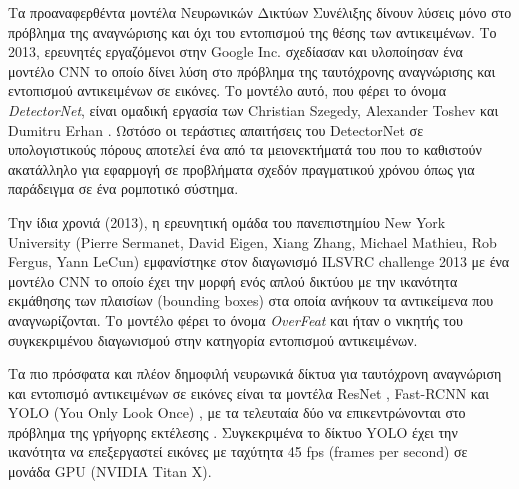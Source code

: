 Τα προαναφερθέντα μοντέλα Νευρωνικών Δικτύων Συνέλιξης δίνουν
λύσεις μόνο στο πρόβλημα της αναγνώρισης και όχι
του εντοπισμού της θέσης των αντικειμένων.
Το 2013, ερευνητές εργαζόμενοι στην Google Inc. σχεδίασαν και υλοποίησαν ένα
μοντέλο CNN το οποίο δίνει λύση στο πρόβλημα της ταυτόχρονης
αναγνώρισης και εντοπισμού αντικειμένων σε εικόνες.
Το μοντέλο αυτό, που φέρει το όνομα \emph{DetectorNet}, είναι ομαδική εργασία των
Christian Szegedy, Alexander Toshev και Dumitru Erhan \cite{szegedy2013deep}.
Ωστόσο οι τεράστιες απαιτήσεις του DetectorNet σε υπολογιστικούς πόρους αποτελεί
ένα από τα μειονεκτήματά του που το καθιστούν ακατάλληλο για εφαρμογή σε
προβλήματα σχεδόν πραγματικού χρόνου όπως για παράδειγμα σε ένα
ρομποτικό σύστημα.

Την ίδια χρονιά (2013), η ερευνητική ομάδα του πανεπιστημίου New York \\
University
(Pierre Sermanet, David Eigen, Xiang Zhang, Michael Mathieu, Rob Fergus, Yann LeCun)
εμφανίστηκε στον διαγωνισμό ILSVRC challenge 2013 με ένα μοντέλο CNN το οποίο
έχει την μορφή ενός απλού δικτύου με την ικανότητα εκμάθησης
των πλαισίων (bounding boxes) στα οποία ανήκουν τα αντικείμενα που αναγνωρίζονται.
Το μοντέλο φέρει το όνομα \emph{OverFeat} \cite{sermanet2013overfeat} και ήταν
ο νικητής του συγκεκριμένου διαγωνισμού στην κατηγορία εντοπισμού αντικειμένων.

Τα πιο πρόσφατα και πλέον δημοφιλή νευρωνικά δίκτυα για ταυτόχρονη
αναγνώριση και εντοπισμό αντικειμένων σε εικόνες είναι τα μοντέλα
ResNet \cite{DBLP:journals/corr/HeZRS15}, Fast-RCNN \cite{DBLP:journals/corr/Girshick15}
και YOLO (You Only Look Once) \cite{DBLP:journals/corr/RedmonDGF15}, με τα
τελευταία δύο να επικεντρώνονται στο πρόβλημα της γρήγορης εκτέλεσης .
Συγκεκριμένα το δίκτυο YOLO έχει την ικανότητα να επεξεργαστεί εικόνες με
ταχύτητα 45 fps (frames per second) σε μονάδα GPU (NVIDIA Titan Χ).
